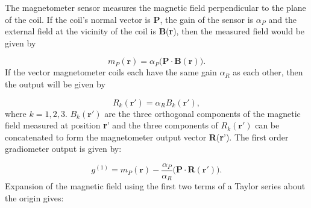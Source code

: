 The magnetometer sensor measures the magnetic field perpendicular to the plane of the coil. If the coil's normal vector is \textbf{P}, the gain of the sensor is $\alpha_P$ and the external field at the vicinity of the coil is \textbf{B}(\textbf{r}), then the measured field would be given by

\begin{equation}
m_P(\mathbf{r})=\alpha_P\big(\mathbf{P\cdot B}(\mathbf{r})\big).
\end{equation} If the vector magnetometer coils each have the same gain $\alpha_R$ as each other, then the output will be given by 

\begin{equation}
R_k(\mathbf{r}')=\alpha_RB_k(\mathbf{r}'),
\end{equation} where $k=1,2,3$. $B_k(\mathbf{r}')$ are the three orthogonal components of the magnetic field measured at position \textbf{r}' and the three components of $R_k(\mathbf{r}')$ can be concatenated  to form the magnetometer output vector \textbf{R}(\textbf{r}'). The first order gradiometer output is given by:

\begin{equation}
g^{(1)}=m_P(\mathbf{r})-\frac{\alpha_P}{\alpha_R}\big(\mathbf{P} \cdot\mathbf{R}(\mathbf{r}')\big). \label{eqn_1_19}
\end{equation} Expansion of the magnetic field using the first two terms of a Taylor series about the origin gives:

